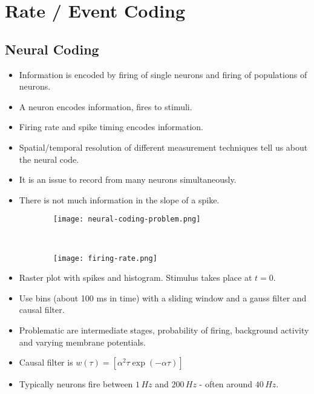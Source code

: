 \documentclass[main]{subfiles}
\begin{document}

\section{Rate / Event Coding}
\subsection{Neural Coding}
\begin{itemize}[noitemsep,nolistsep]
	\item Information is encoded by firing of single neurons and firing of populations of neurons.
	\item A neuron encodes information, fires to stimuli.
	\item Firing rate and spike timing encodes information.
	\item Spatial/temporal resolution of different measurement techniques tell us about the neural code.
	\item It is an issue to record from many neurons simultaneously.
	\item There is not much information in the slope of a spike.
\end{itemize}
\begin{figure}[H]
	\centering
	\begin{subfigure}[b]{0.5\textwidth}
		\centering
		\texttt{[image: neural-coding-problem.png]}
	\end{subfigure}%
	~
	\begin{subfigure}[b]{0.5\textwidth}
		\centering
		\texttt{[image: firing-rate.png]}
	\end{subfigure}
\end{figure}
\begin{itemize}[noitemsep,nolistsep]
	\item Raster plot with spikes and histogram. Stimulus takes place at $t = 0$.
	\item Use bins (about 100 ms in time) with a sliding window and a gauss filter and causal filter.
	\item Problematic are intermediate stages, probability of firing, background activity and varying membrane potentials.
	\item Causal filter is $w(\tau) = [\alpha^2\tau\exp(-\alpha\tau)]$
	\item Typically neurons fire between $1\,Hz$ and $200\,Hz$ - often around $40\,Hz$.
\end{itemize}
\end{document}

